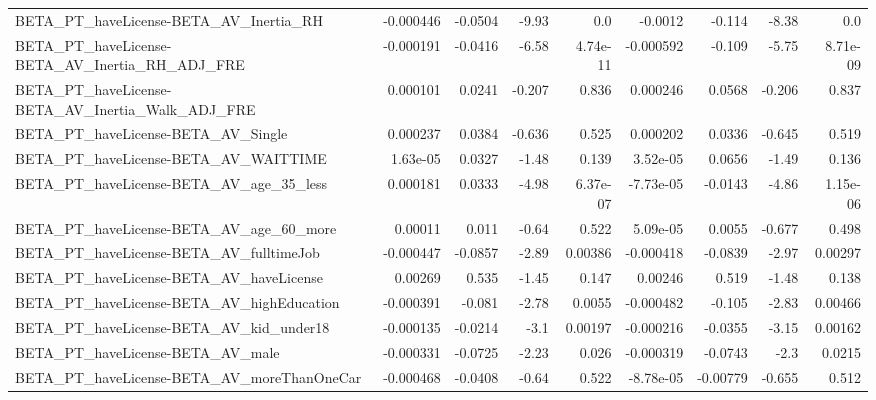 \begin{tabular}{lrrrrrrrr}
BETA\_PT\_haveLicense-BETA\_AV\_Inertia\_RH             &   -0.000446 &      -0.0504 &    -9.93 &      0.0 &    -0.0012 &      -0.114 &        -8.38 &           0.0 \\
BETA\_PT\_haveLicense-BETA\_AV\_Inertia\_RH\_ADJ\_FRE     &   -0.000191 &      -0.0416 &    -6.58 & 4.74e-11 &  -0.000592 &      -0.109 &        -5.75 &      8.71e-09 \\
BETA\_PT\_haveLicense-BETA\_AV\_Inertia\_Walk\_ADJ\_FRE   &    0.000101 &       0.0241 &   -0.207 &    0.836 &   0.000246 &      0.0568 &       -0.206 &         0.837 \\
BETA\_PT\_haveLicense-BETA\_AV\_Single                 &    0.000237 &       0.0384 &   -0.636 &    0.525 &   0.000202 &      0.0336 &       -0.645 &         0.519 \\
BETA\_PT\_haveLicense-BETA\_AV\_WAITTIME               &    1.63e-05 &       0.0327 &    -1.48 &    0.139 &   3.52e-05 &      0.0656 &        -1.49 &         0.136 \\
BETA\_PT\_haveLicense-BETA\_AV\_age\_35\_less            &    0.000181 &       0.0333 &    -4.98 & 6.37e-07 &  -7.73e-05 &     -0.0143 &        -4.86 &      1.15e-06 \\
BETA\_PT\_haveLicense-BETA\_AV\_age\_60\_more            &     0.00011 &        0.011 &    -0.64 &    0.522 &   5.09e-05 &      0.0055 &       -0.677 &         0.498 \\
BETA\_PT\_haveLicense-BETA\_AV\_fulltimeJob            &   -0.000447 &      -0.0857 &    -2.89 &  0.00386 &  -0.000418 &     -0.0839 &        -2.97 &       0.00297 \\
BETA\_PT\_haveLicense-BETA\_AV\_haveLicense            &     0.00269 &        0.535 &    -1.45 &    0.147 &    0.00246 &       0.519 &        -1.48 &         0.138 \\
BETA\_PT\_haveLicense-BETA\_AV\_highEducation          &   -0.000391 &       -0.081 &    -2.78 &   0.0055 &  -0.000482 &      -0.105 &        -2.83 &       0.00466 \\
BETA\_PT\_haveLicense-BETA\_AV\_kid\_under18            &   -0.000135 &      -0.0214 &     -3.1 &  0.00197 &  -0.000216 &     -0.0355 &        -3.15 &       0.00162 \\
BETA\_PT\_haveLicense-BETA\_AV\_male                   &   -0.000331 &      -0.0725 &    -2.23 &    0.026 &  -0.000319 &     -0.0743 &         -2.3 &        0.0215 \\
BETA\_PT\_haveLicense-BETA\_AV\_moreThanOneCar         &   -0.000468 &      -0.0408 &    -0.64 &    0.522 &  -8.78e-05 &    -0.00779 &       -0.655 &         0.512 \\

\end{tabular}

